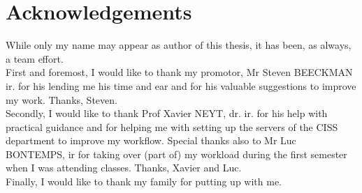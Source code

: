 \chapter*{Acknowledgements}
While only my name may appear as author of this thesis, it has been, as always, a team effort.\\
First and foremost, I would like to thank my promotor, Mr Steven BEECKMAN ir. for his lending me his time and ear and for his valuable suggestions to improve my work. Thanks, Steven.\\
Secondly, I would like to thank Prof  Xavier NEYT, dr. ir. for his help with practical guidance and for helping me with setting up the servers of the CISS department to improve my workflow. Special thanks also to Mr Luc BONTEMPS, ir for taking over (part of) my workload during the first semester when I was attending classes. Thanks, Xavier and Luc.\\
Finally, I would like to thank my family for putting up with me.

